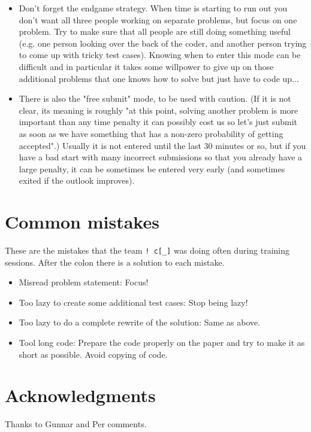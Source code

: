 \documentclass{article}
\begin{document}
\begin{itemize}
  \item Don't forget the endgame strategy.  When time is starting to run out you
  don't want all three people working on separate problems, but focus on one
  problem.  Try to make sure that all people are still doing something useful
  (e.g. one person looking over the back of the coder, and another person trying
  to come up with tricky test cases). Knowing when to enter this mode can be
  difficult and in particular it takes some willpower to give up on those
  additional problems that one knows how to solve but just have to code up...

  \item There is also the "free submit" mode, to be used with caution. (If it is
  not clear, its meaning is roughly "at this point, solving another problem is
  more important than any time penalty it can possibly cost us so let's just
  submit as soon as we have something that has a non-zero probability of getting
  accepted".) Usually it is not entered until the last 30 minutes or so, but if
  you have a bad start with many incorrect submissions so that you already have
  a large penalty, it can be sometimes be entered very early (and sometimes
  exited if the outlook improves).
\end{itemize}

\section{Common mistakes}

These are the mistakes that the team {\tt ! c[\_]} was doing often during training
sessions. After the colon there is a solution to each mistake.
\begin{itemize}
  \item Misread problem statement: Focus!
  \item Too lazy to create some additional test cases: Stop being lazy!
  \item Too lazy to do a complete rewrite of the solution: Same as above.
  \item Tool long code: Prepare the code properly on the paper and try to make
  it as short as possible. Avoid copying of code.
\end{itemize}

\section*{Acknowledgments}
Thanks to Gunnar and Per comments.
\end{document}
